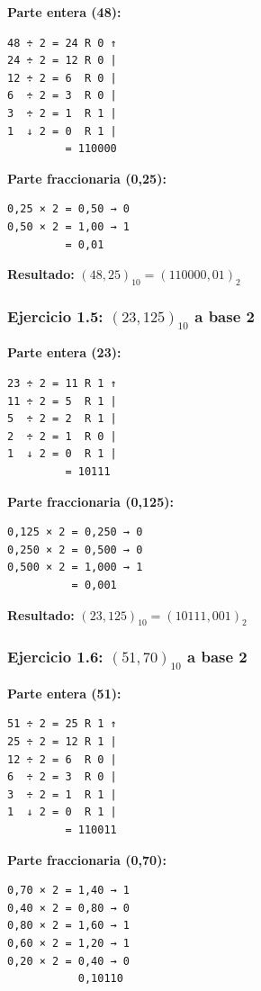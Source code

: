 \documentclass[12pt,a4paper]{article}
\begin{document}
\begin{minipage}[t]{0.48\textwidth}
\textbf{Parte entera (48):}
\begin{verbatim}
48 ÷ 2 = 24 R 0 ↑
24 ÷ 2 = 12 R 0 |
12 ÷ 2 = 6  R 0 |
6  ÷ 2 = 3  R 0 |
3  ÷ 2 = 1  R 1 |
1  ↓ 2 = 0  R 1 |
         = 110000
\end{verbatim}
\end{minipage}
\hfill
\begin{minipage}[t]{0.48\textwidth}
\textbf{Parte fraccionaria (0,25):}
\begin{verbatim}
0,25 × 2 = 0,50 → 0
0,50 × 2 = 1,00 → 1
         = 0,01
\end{verbatim}
\end{minipage}

\vspace{0.3cm}
\textbf{Resultado:} $(48,25)_{10} = (110000,01)_2$

\subsubsection{Ejercicio 1.5: $(23,125)_{10}$ a base 2}

\begin{minipage}[t]{0.48\textwidth}
\textbf{Parte entera (23):}
\begin{verbatim}
23 ÷ 2 = 11 R 1 ↑
11 ÷ 2 = 5  R 1 |
5  ÷ 2 = 2  R 1 |
2  ÷ 2 = 1  R 0 |
1  ↓ 2 = 0  R 1 |
         = 10111
\end{verbatim}
\end{minipage}
\hfill
\begin{minipage}[t]{0.48\textwidth}
\textbf{Parte fraccionaria (0,125):}
\begin{verbatim}
0,125 × 2 = 0,250 → 0
0,250 × 2 = 0,500 → 0
0,500 × 2 = 1,000 → 1
          = 0,001
\end{verbatim}
\end{minipage}

\vspace{0.3cm}
\textbf{Resultado:} $(23,125)_{10} = (10111,001)_2$

\subsubsection{Ejercicio 1.6: $(51,70)_{10}$ a base 2}

\begin{minipage}[t]{0.48\textwidth}
\textbf{Parte entera (51):}
\begin{verbatim}
51 ÷ 2 = 25 R 1 ↑
25 ÷ 2 = 12 R 1 |
12 ÷ 2 = 6  R 0 |
6  ÷ 2 = 3  R 0 |
3  ÷ 2 = 1  R 1 |
1  ↓ 2 = 0  R 1 |
         = 110011
\end{verbatim}
\end{minipage}
\hfill
\begin{minipage}[t]{0.48\textwidth}
\textbf{Parte fraccionaria (0,70):}
\begin{verbatim}
0,70 × 2 = 1,40 → 1
0,40 × 2 = 0,80 → 0
0,80 × 2 = 1,60 → 1
0,60 × 2 = 1,20 → 1
0,20 × 2 = 0,40 → 0
           0,10110
\end{verbatim}
\end{minipage}
\end{document}

